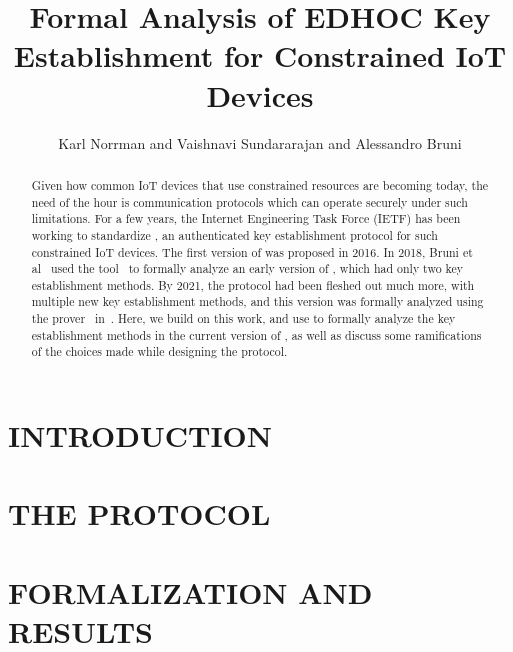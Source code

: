\documentclass[runningheads]{llncs}
\title{Formal Analysis of EDHOC Key Establishment for Constrained IoT Devices}
\author{
        Karl Norrman and 
        Vaishnavi Sundararajan and
        Alessandro Bruni
}
\begin{document}
\maketitle
%
\begin{abstract}
Given how common IoT devices that use constrained resources are becoming today, the need of the hour is communication protocols which can operate securely under such limitations.
%
For a few years, the Internet Engineering Task Force (IETF) has been working to standardize \mEdhoc{}, an authenticated key establishment protocol for such constrained IoT devices.
%
The first version of \mEdhoc{} was proposed in 2016.
%
In 2018, Bruni et al~\cite{DBLP:conf/secsr/BruniJPS18} used the \mProverif{} tool~\cite{DBLP:conf/csfw/Blanchet01} to formally analyze an early version of \mEdhoc{}, which had only two key establishment methods.  
%
By 2021, the protocol had been fleshed out much more, with multiple new key establishment methods, and this version was formally analyzed using the \mTamarin{} prover~\cite{DBLP:conf/cav/MeierSCB13} in~\cite{Norr21}.
%
Here, we build on this work, and use \mTamarin{} to formally analyze the key establishment methods in the current version of \mEdhoc{}, as well as discuss some ramifications of the choices made while designing the protocol.
\end{abstract}
%
\section{\uppercase{Introduction}}
\label{sec:introduction}


\section{\uppercase{The \mEdhoc{} Protocol}}
\label{sec:edhoc}


\section{\uppercase{Formalization and Results}}
\label{sec:formalization}

\end{document}
